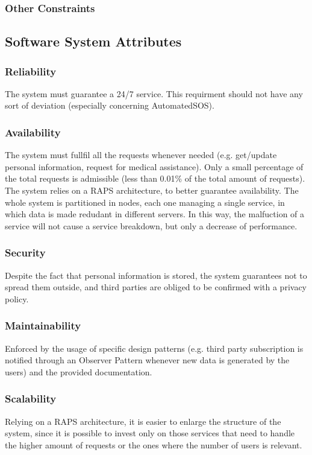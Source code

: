 \documentclass[12pt,a4paper]{article}
\begin{document}
	\subsubsection{Other Constraints}
	
	\subsection{Software System Attributes}
	\subsubsection{Reliability}
	The system must guarantee a 24/7 service. This requirment should not have any sort of deviation (especially concerning AutomatedSOS).
	\subsubsection{Availability}
	The system must fullfil all the requests whenever needed (e.g. get/update personal information, request for medical assistance). Only a small percentage of the total requests is admissible (less than 0.01\% of the total amount of requests). The system relies on a RAPS architecture, to better guarantee availability. The whole system is partitioned in nodes, each one managing a single service, in which data is made redudant in different servers. In this way, the malfuction of a service will not cause a service breakdown, but only a decrease of performance.
	\subsubsection{Security}
	Despite the fact that personal information is stored, the system guarantees not to spread them outside, and third parties are obliged to be confirmed with a privacy policy.
	\subsubsection{Maintainability}
	Enforced by the usage of specific design patterns (e.g. third party subscription is notified through an Observer Pattern whenever new data is generated by the users) and the provided documentation.
	\subsubsection{Scalability}
	Relying on a RAPS architecture, it is easier to enlarge the structure of the system, since it is possible to invest only on those services that need to handle the higher amount of requests or the ones where the number of users is relevant.
	
\end{document}
